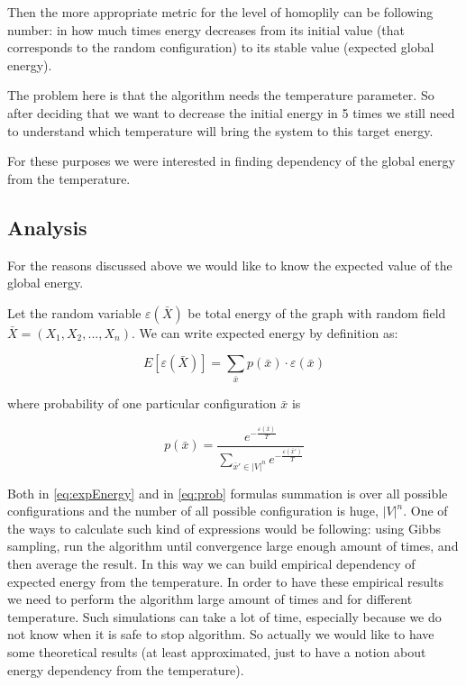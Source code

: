 \documentclass[12pt]{report}
\begin{document}
Then the more appropriate metric for the level of homoplily can be following number: in how much times energy decreases from its initial value (that corresponds to the random configuration) to its stable value (expected global energy).

The problem here is that the algorithm needs the temperature parameter. So after deciding that we want to decrease the initial energy in 5 times we still need to understand which temperature will bring the system to this target energy.

For these purposes we were interested in finding dependency of the global energy from the temperature. 


\subsection{Analysis}

For the reasons discussed above we would like to know the expected value of the global energy. 

Let the random variable $ \varepsilon (\bar{X})$ be total energy of the graph with random field $\bar{X} = (X_1, X_2, ..., X_n)$. We can write expected energy by definition as:

\begin{equation}\label{eq:expEnergy}
E[\varepsilon (\bar{X})] = \sum\limits_{\bar{x}} p(\bar{x}) \cdot \varepsilon(\bar{x})
\end{equation}


where probability of one particular configuration $\bar{x}$ is  

\begin{equation}\label{eq:prob}
p(\bar{x}) = \frac{ e^{-\frac{ \varepsilon (\bar{x})}{T}} }{ \sum\limits_{\bar{x}'\in |V|^n} e^{-\frac{\varepsilon(\bar{x}')}{T}}} 
\end{equation}

Both in \ref{eq:expEnergy} and in \ref{eq:prob} formulas summation is over all possible configurations and the number of all possible configuration is huge, $|V|^n$. One of the ways to calculate such kind of expressions would be following: using Gibbs sampling, run the algorithm until convergence large enough amount of times, and then average the result. In this way we can build empirical dependency of expected energy from the temperature. In order to have these empirical results we need to perform the algorithm large amount of times and for different temperature. Such simulations can take a lot of time, especially because we do not know when it is safe to stop algorithm. So actually we would like to have some theoretical results (at least approximated, just to have a notion about energy dependency from the temperature).
\end{document}
